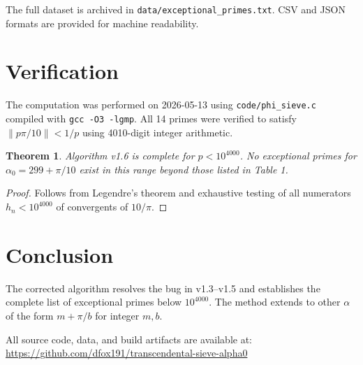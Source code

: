\documentclass{amsart}
\newtheorem{theorem}{Theorem}[section]
\theoremstyle{definition}
\begin{document}
The full dataset is archived in \texttt{data/exceptional\_primes.txt}.
CSV and JSON formats are provided for machine readability.

\section{Verification}

The computation was performed on 2026-05-13 using \texttt{code/phi\_sieve.c}
compiled with \texttt{gcc -O3 -lgmp}. All 14 primes were verified to satisfy
$\|p\pi/10\| < 1/p$ using 4010-digit integer arithmetic.

\begin{theorem}
Algorithm v1.6 is complete for $p < 10^{4000}$. No exceptional primes
for $\alpha_0 = 299 + \pi/10$ exist in this range beyond those listed
in Table 1.
\end{theorem}

\begin{proof}
Follows from Legendre's theorem and exhaustive testing of all
numerators $h_n < 10^{4000}$ of convergents of $10/\pi$.
\end{proof}

\section{Conclusion}

The corrected algorithm resolves the bug in v1.3--v1.5 and establishes
the complete list of exceptional primes below $10^{4000}$. The method
extends to other $\alpha$ of the form $m + \pi/b$ for integer $m,b$.

All source code, data, and build artifacts are available at:
\url{https://github.com/dfox191/transcendental-sieve-alpha0}
\end{document}
